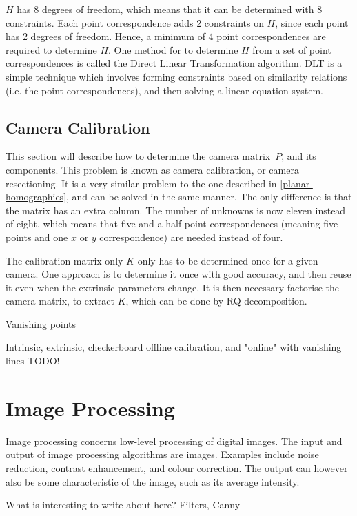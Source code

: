 $H$ has 8 degrees of freedom, which means that it can be determined with 8 constraints. Each point correspondence adds 2 constraints on $H$, since each point has 2 degrees of freedom.
Hence, a minimum of 4 point correspondences are required to determine $H$.
One method for to determine $H$ from a set of point correspondences is called the Direct Linear Transformation algorithm.
DLT is a simple technique which involves forming constraints based on similarity relations (i.e. the point correspondences), and then solving a linear equation system.
\cite{homography-estimation}

\subsection{Camera Calibration}
This section will describe how to determine the camera matrix $P$, and its components.
This problem is known as camera calibration, or camera resectioning.
It is a very similar problem to the one described in \ref{planar-homographies}, and can be solved in the same manner.
The only difference is that the matrix has an extra column. The number of unknowns is now eleven instead of eight, which means that five and a half point correspondences (meaning five points and one $x$ or $y$ correspondence) are needed instead of four.

The calibration matrix only $K$ only has to be determined once for a given camera.
One approach is to determine it once with good accuracy, and then reuse it even when the extrinsic parameters change.
It is then necessary factorise the camera matrix, to extract $K$, which can be done by RQ-decomposition\cite{qr-decomposition}.

Vanishing points %

Intrinsic, extrinsic, checkerboard offline calibration, and "online" with vanishing lines TODO! %
\section{Image Processing}
Image processing concerns low-level processing of digital images. 
The input and output of image processing algorithms are images. 
Examples include noise reduction, contrast enhancement, and colour correction. 
The output can however also be some characteristic of the image, such as its average intensity.\cite[p. 1-2]{pitas}\cite[p. 1-2]{gonzalez-woods}

What is interesting to write about here? Filters, Canny %

